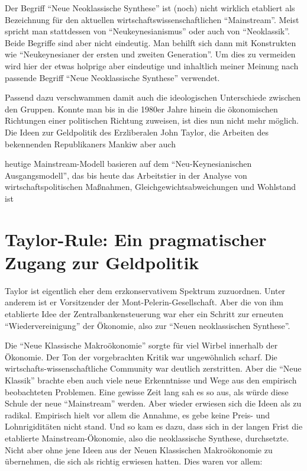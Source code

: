 Der Begriff "`Neue Neoklassische Synthese"' ist (noch) nicht wirklich etabliert als Bezeichnung für den aktuellen wirtschaftswissenschaftlichen "`Mainstream"'. Meist spricht man stattdessen von "`Neukeynesianismus"' oder auch von "`Neoklassik"'. Beide Begriffe sind aber nicht eindeutig. Man behilft sich dann mit Konstrukten wie "`Neukeynesianer der ersten und zweiten Generation"'. Um dies zu vermeiden wird hier der etwas holprige aber eindeutige und inhaltlich meiner Meinung nach passende Begriff "`Neue Neoklassische Synthese"' verwendet.

Passend dazu verschwammen damit auch die ideologischen Unterschiede zwischen den Gruppen. Konnte man bis in die 1980er Jahre hinein die ökonomischen Richtungen einer politischen Richtung zuweisen, ist dies nun nicht mehr möglich.
Die Ideen zur Geldpolitik des Erzliberalen John Taylor, die Arbeiten des bekennenden Republikaners Mankiw aber auch 


heutige Mainstream-Modell basieren auf dem "`Neu-Keynesianischen Ausgangsmodell"', das bis heute das Arbeitstier in der Analyse von wirtschaftspolitischen Maßnahmen, Gleichgewichtsabweichungen und Wohlstand ist \parencite[S. 52]{Gali2015}






\section{Taylor-Rule: Ein pragmatischer Zugang zur Geldpolitik}
Taylor ist eigentlich eher dem erzkonservativem Spektrum zuzuordnen. Unter anderem ist er Vorsitzender der Mont-Pelerin-Gesellschaft. Aber die von ihm etablierte Idee der Zentralbankensteuerung war eher ein Schritt zur erneuten "`Wiedervereinigung"' der Ökonomie, also zur "`Neuen neoklassischen Synthese"'.

Die "`Neue Klassische Makroökonomie"' sorgte für viel Wirbel innerhalb der Ökonomie. Der Ton der vorgebrachten Kritik war ungewöhnlich scharf. Die wirtschafts-wissenschaftliche Community war deutlich zerstritten. Aber die "`Neue Klassik"' brachte eben auch viele neue Erkenntnisse und Wege aus den empirisch beobachteten Problemen. Eine gewisse Zeit lang sah es so aus, als würde diese Schule der neue "`Mainstream"' werden. Aber wieder erwiesen sich die Ideen als zu radikal. Empirisch hielt vor allem die Annahme, es gebe keine Preis- und Lohnrigiditäten nicht stand.
Und so kam es dazu, dass sich in der langen Frist die etablierte Mainstream-Ökonomie, also die neoklassische Synthese, durchsetzte. Nicht aber ohne jene Ideen aus der Neuen Klassischen Makroökonomie zu übernehmen, die sich als richtig erwiesen hatten. Dies waren vor allem:

